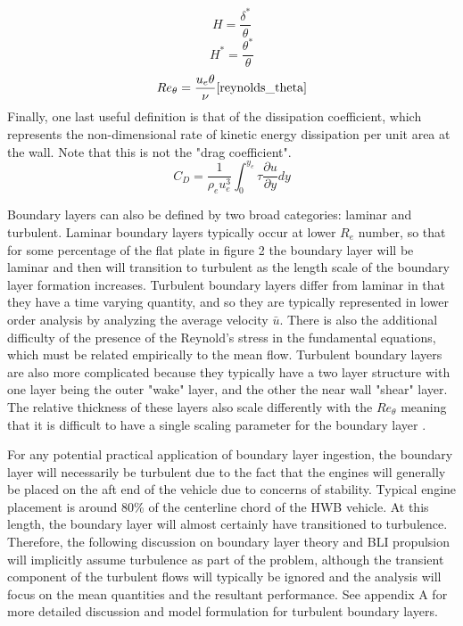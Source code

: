 \documentclass[12pt]{gatech-thesis}
\begin{document}
\begin{equation} H = \frac{\delta^*}{\theta}\label{shape_factor}\end{equation} 
\begin{equation} H^* = \frac{\theta^*}{\theta}\label{pseudo_energy_factor}\end{equation}
\begin{equation} Re_\theta =  \frac{u_e\theta}{\nu}\label{reynolds_theta}\ref{reynolds_theta}\end{equation}
Finally, one last useful definition is that of the dissipation coefficient, which represents the non-dimensional rate of kinetic energy dissipation per unit area at the wall.  Note that this is not the "drag coefficient".
\begin{equation} C_D = \frac{1}{\rho_e u_e^3}\int_0^{y_e}\tau \frac{\partial u}{\partial y}dy\end{equation}

Boundary layers can also be defined by two broad categories:  laminar and turbulent.  Laminar boundary layers typically occur at lower $R_e$ number, so that for some percentage of the flat plate in figure 2 the boundary layer will be laminar and then will transition to turbulent as the length scale of the boundary layer formation increases.  Turbulent boundary layers differ from laminar in that they have a time varying quantity, and so they are typically represented in lower order analysis by analyzing the average velocity $\bar{u}$.  There is also the additional difficulty of the presence of the Reynold's stress in the fundamental equations, which must be related empirically to the mean flow.  Turbulent boundary layers are also more complicated because they typically have a two layer structure with one layer being the outer "wake" layer, and the other the near wall "shear" layer.  The relative thickness of these layers also scale differently with the $Re_\theta$ meaning that it is difficult to have a single scaling parameter for the boundary layer \cite{DrelaThesis}.  

For any potential practical application of boundary layer ingestion, the boundary layer will necessarily be turbulent due to the fact that the engines will generally be placed on the aft end of the vehicle due to concerns of stability.  Typical engine placement is around 80\% of the centerline chord of the HWB vehicle.  At this length, the boundary layer will almost certainly have transitioned to turbulence.  Therefore, the following discussion on boundary layer theory and BLI propulsion will implicitly assume turbulence as part of the problem, although the transient component of the turbulent flows will typically be ignored and the analysis will focus on the mean quantities and the resultant performance.  See appendix A for more detailed discussion and model formulation for turbulent boundary layers.  
\end{document}
